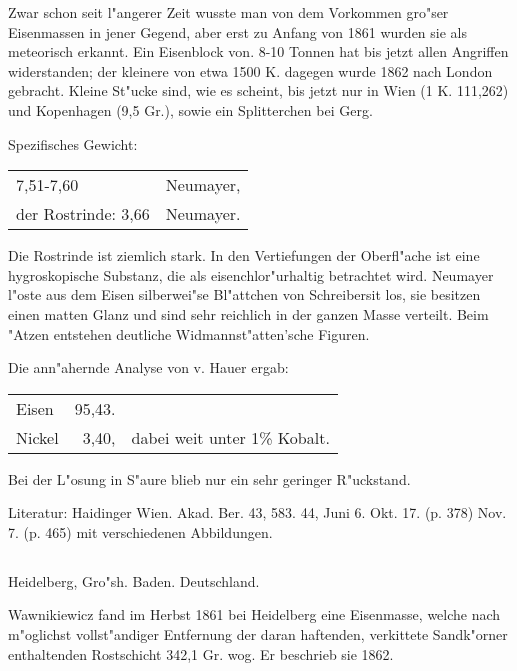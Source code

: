 \documentclass[a4paper, 11pt, oneside]{article}
\begin{document}
Zwar schon seit l"angerer Zeit wusste man von dem Vorkommen gro"ser Eisenmassen in jener Gegend, aber erst zu Anfang von 1861 wurden sie als meteorisch erkannt. Ein Eisenblock von. 8-10 Tonnen hat bis jetzt allen Angriffen widerstanden; der kleinere von etwa 1500 K. dagegen wurde 1862 nach London gebracht. Kleine St"ucke sind, wie es scheint, bis jetzt nur in Wien (1 K. 111,262) und Kopenhagen (9,5 Gr.), sowie ein Splitterchen bei Gerg.

Spezifisches Gewicht: 
\begin{table}[!ht]
    \centering\swabfamily\Large
    \begin{tabular}{l l}
        7,51-7,60 & Neumayer,\\
        der Rostrinde: 3,66 & Neumayer.
    \end{tabular}
\end{table}

Die Rostrinde ist ziemlich stark. In den Vertiefungen der Oberfl"ache ist eine hygroskopische Substanz, die als eisenchlor"urhaltig betrachtet wird. Neumayer l"oste aus dem Eisen silberwei"se Bl"attchen von Schreibersit los, sie besitzen einen matten Glanz und sind sehr reichlich in der ganzen Masse verteilt. Beim "Atzen entstehen deutliche Widmannst"atten'sche Figuren.

Die ann"ahernde Analyse von v. Hauer ergab:
\begin{table}[H]
    \centering\swabfamily\Large
    \begin{tabular}{l r l}
        Eisen & 95,43. & \\
        Nickel & 3,40, & dabei weit unter 1\% Kobalt. \\
    \end{tabular}
\end{table}

Bei der L"osung in S"aure blieb nur ein sehr geringer R"uckstand.

\normalsize
Literatur: Haidinger Wien. Akad. Ber. 43, 583. 44, Juni 6. Okt. 17. (p. 378) Nov. 7. (p. 465) mit verschiedenen Abbildungen.

\subsection{}
\LARGE
\paragraph{}
Heidelberg, Gro"sh. Baden. Deutschland.

Wawnikiewicz fand im Herbst 1861 bei Heidelberg eine Eisenmasse, welche nach m"oglichst vollst"andiger Entfernung der daran haftenden, verkittete Sandk"orner enthaltenden Rostschicht 342,1 Gr. wog. Er beschrieb sie 1862.
\end{document}
